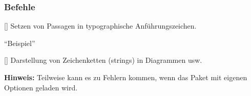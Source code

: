 \subsubsection{Befehle}
\begin{commands}
    [] Setzen von Passagen in typographische Anführungszeichen.
\begin{sidebyside}[gobble=4]
    \enquote{Beispiel}
\end{sidebyside}

    [] Darstellung von Zeichenketten (strings) in Diagrammen usw.
\begin{sidebyside}[gobble=4]
\end{sidebyside}
\end{commands}

    \textbf{Hinweis:} Teilweise kann es zu Fehlern kommen, wenn das Paket  mit eigenen Optionen geladen wird.
